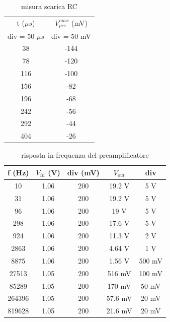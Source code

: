 \documentclass{article}
\begin{document}
\begin{table}[H]
    \centering
    \begin{tabular}{cc}
        \toprule
        t ($\mu s$)& $V_{pre}^{max}$ (mV) \\
        div = 50 $\mu s$ & div = 50 mV\\
        \midrule
        38 & -144 \\
        78 & -120 \\
        116 & -100 \\
        156 & -82 \\
        196 & -68 \\
        242 & -56 \\
        292 & -44 \\
        404 & -26 \\
        \bottomrule
    \end{tabular}
    \caption{misura scarica RC}
\end{table}

\begin{table}[H]
    \centering
    \begin{tabular}{ccccc}
        \toprule
        f (Hz) & $V_{in}$ (V) & div (mV) & $V_{out}$ & div\\
        \midrule
        10 & 1.06 & 200 & 19.2 V & 5 V\\
        31 & 1.06 & 200 & 19.2 V& 5 V\\
        96 & 1.06 & 200 & 19 V& 5 V\\
        298 & 1.06 & 200 & 17.6 V& 5 V\\
        924 & 1.06 & 200 & 11.3 V& 2 V\\
        2863 & 1.06 & 200 & 4.64 V& 1 V\\
        8875 & 1.06 & 200 & 1.56 V& 500 mV\\
        27513 & 1.05 & 200 & 516 mV& 100 mV\\
        85289 & 1.05 & 200 & 170 mV& 50 mV\\
        264396 & 1.05 & 200 & 57.6 mV & 20 mV\\
        819628 & 1.05 & 200 & 21.6 mV& 20 mV\\
        \bottomrule
    \end{tabular}
    \caption{risposta in frequenza del preamplificatore}
\end{table}
\end{document}
